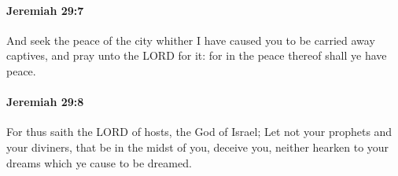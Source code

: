 		\paragraph{Jeremiah 29:7} %
			\label{JEREMIAH-29-7}

			And seek the peace of the city whither I have caused you to be carried away captives, and pray unto the LORD for it: for in the peace thereof shall ye have peace.


		\paragraph{Jeremiah 29:8} %
			\label{JEREMIAH-29-8}

			For thus saith the LORD of hosts, the God of Israel; Let not your prophets and your diviners, that be in the midst of you, deceive you, neither hearken to your dreams which ye cause to be dreamed.


